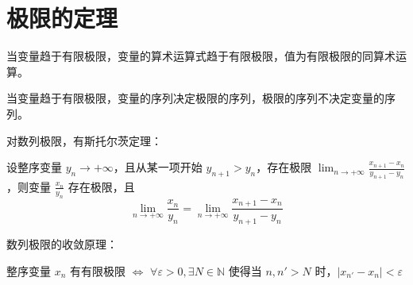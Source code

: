 \documentclass{ctexart}
\begin{document}
\section{极限的定理}

\theorem 当变量趋于有限极限，变量的算术运算式趋于有限极限，值为有限极限的同算术运算。

\theorem 当变量趋于有限极限，变量的序列决定极限的序列，极限的序列不决定变量的序列。

对数列极限，有斯托尔茨定理：

\theorem 设整序变量 $y_n \to +\infty$，且从某一项开始 $y_{n+1} > y_n$，存在极限
$ \lim_{n\to +\infty} \frac{x_{n+1} - x_n}{y_{n+1}-y_n} $，则变量 $\frac{x_n}{y_n}$
存在极限，且
$$
\lim_{n\to +\infty} \frac{x_n}{y_n} = 
\lim_{n\to +\infty} \frac{x_{n+1} - x_n}{y_{n+1}-y_n}
$$

数列极限的收敛原理：

\theorem 整序变量 $x_n$ 有有限极限 $\iff$
$\forall \varepsilon > 0, \exists N \in \mathbb{N} $
使得当 $n,n' > N$ 时，$\lvert x_{n'} - x_n \rvert < \varepsilon$
\end{document}
